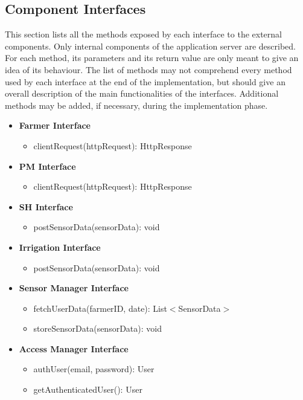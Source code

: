 \documentclass[10pt]{article} %
\begin{document}
\subsection{Component Interfaces}
This section lists all the methods exposed by each interface to the external components. Only internal components of the application server are described.
For each method, its parameters and its return value are only meant to give an idea of its behaviour. The list of methods may not comprehend every method
used by each interface at the end of the implementation, but should give an overall description of the main functionalities of the interfaces. Additional methods
may be added, if necessary, during the implementation phase.
\begin{itemize}
    \item \textbf{Farmer Interface}
    \begin{itemize}
        \item clientRequest(httpRequest): HttpResponse
    \end{itemize}
    \item \textbf{PM Interface}
    \begin{itemize}
        \item clientRequest(httpRequest): HttpResponse
    \end{itemize}
    \item \textbf{SH Interface}
    \begin{itemize}
        \item postSensorData(sensorData): void
    \end{itemize}
    \item \textbf{Irrigation Interface}
    \begin{itemize}
        \item postSensorData(sensorData): void
    \end{itemize}
    \item \textbf{Sensor Manager Interface}
    \begin{itemize}
        \item fetchUserData(farmerID, date): List$<$SensorData$>$
        \item storeSensorData(sensorData): void
    \end{itemize}
    \item \textbf{Access Manager Interface}
    \begin{itemize}
        \item authUser(email, password): User
        \item getAuthenticatedUser(): User

\end{itemize}
\end{itemize}
\end{document}
